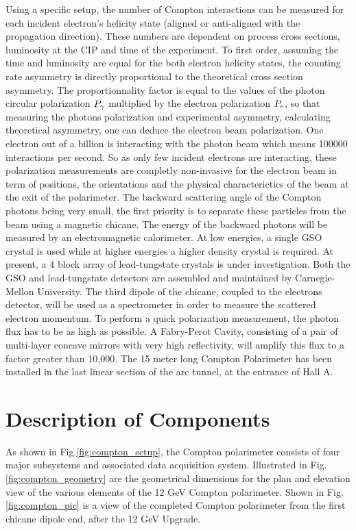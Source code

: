 {Using a specific setup, the number of Compton interactions can be measured for each incident
electron's helicity state (aligned or anti-aligned with the propagation direction). These numbers are
dependent on process cross sections, luminosity at the CIP and time of the experiment.
To first order, assuming the time and luminosity are equal for the both electron helicity states, the
counting rate asymmetry is directly proportional to the theoretical cross section asymmetry.
The proportionnality factor is equal to the values of the photon circular polarization $P_{\gamma}$
multiplied by the
electron polarization $P_{{e}}$, so that measuring the photons polarization and experimental asymmetry, calculating theoretical asymmetry,
one can deduce the electron beam polarization. One electron out of a billion is interacting with
the photon beam which means 100000 interactions per second. So as only few incident electrons
are interacting, these polarization measurements are completly non-invasive for the electron beam
in term of positions, the orientations and the physical
characterictics of the beam at the exit of the polarimeter.
The backward scattering angle of the Compton
photons being very small, the first priority is to separate these particles from the beam using a
magnetic chicane. The energy of the backward photons will be measured by an electromagnetic calorimeter. 
At low energies, a single GSO crystal is used while at higher energies a higher density crystal is required.
At present, a 4 block array of lead-tungstate crystals is under investigation. Both the GSO and lead-tungstate
detectors are assembled and maintained  by Carnegie-Mellon University. The third dipole of the chicane, coupled to the electrons
detector, will be used as a spectrometer in order to measure the scattered electron momentum. To perform
a quick polarization measurement, the photon flux has to be as high as possible. A Fabry-Perot Cavity,
consisting of a pair of multi-layer concave mirrors with very high reflectivity, will amplify this flux to a factor
greater than 10,000. The 15 meter long Compton Polarimeter has been installed in the last linear section
of the arc tunnel, at the entrance of Hall A.

\section{Description of Components}
\label{sec:compton_comp}
As  shown in Fig.\ref{fig:compton_setup},
the Compton polarimeter consists of four major subsystems and associated data acquisition system.  Illustrated in Fig.\ref{fig:compton_geometry} are the  geometrical dimensions for the plan and elevation view of the various elements of the 12 GeV Compton polarimeter. Shown in  Fig.\ref{fig:compton_pic} is a  view of the completed Compton polarimeter from the first chicane dipole end, after the 12 GeV Upgrade. 

}
